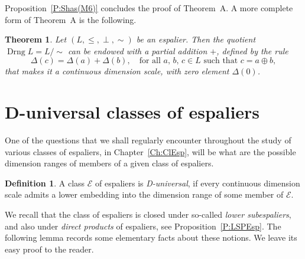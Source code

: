 \documentclass[psamsfonts,reqno]{memo-l}
\theoremstyle{plain}
\newtheorem{theorem}[lemma]{Theorem}
\theoremstyle{definition}
\newtheorem{definition}[lemma]{Definition}
\theoremstyle{remark}
\numberwithin{equation}{section}
\newcommand{\DD}{\Delta}
\DeclareMathOperator{\Drng}{Drng}
\begin{document}
Proposition~\ref{P:Shas(M6)} concludes the proof of Theorem~A. A more
complete form of Theorem~A is the following.

\begin{theorem}\label{T:DimEsp}
Let $(L,\leq,\perp,\sim)$ be an espalier. Then the quotient
$\Drng L=L/{\sim}$\index{Dzzrng@$\Drng L$} can be endowed with a partial
addition $+$, defined by the rule
   \[
   \DD(c)=\DD(a)+\DD(b),\quad\text{for all }a,\,b,\,c\in L\text{ such that }
   c=a\oplus b,
   \]
that makes it a continuous dimension scale, with zero
element $\DD(0)$.
\end{theorem}

\section{D-universal classes of espaliers}\label{S:DUniv}

One of the questions that we shall regularly encounter throughout the study
of various classes of espaliers, in Chapter~\ref{Ch:ClEsp},
will be what are the possible dimension ranges of
members of a given class of espaliers.

\begin{definition}\label{D:DUniv}
A class $\mathcal{E}$ of espaliers is
\emph{D-universal}, if every continuous dimension scale admits a lower embedding into the dimension range of some member of
$\mathcal{E}$.
\end{definition}

We recall that the class of espaliers is closed under
so-called \emph{lower subespaliers}, and also under \emph{direct products} of
espaliers, see Proposition~\ref{P:LSPEsp}.
The following lemma records some elementary facts about these notions. We
leave its easy proof to the reader.
\end{document}
